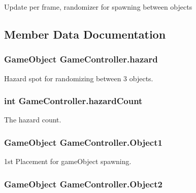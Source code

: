 Update per frame, randomizer for spawning between objects 



\subsection{Member Data Documentation}
\hypertarget{classGameController_a77c185a594a084fe342e8de517808654}{
\subsubsection[{hazard}]{\setlength{\rightskip}{0pt plus 5cm}Game\-Object Game\-Controller.\-hazard}}\label{classGameController_a77c185a594a084fe342e8de517808654}


Hazard spot for randomizing between 3 objects. 

\hypertarget{classGameController_a973f0e7d25e3b260cf0aa51730584ada}{
\subsubsection[{hazard\-Count}]{\setlength{\rightskip}{0pt plus 5cm}int Game\-Controller.\-hazard\-Count}}\label{classGameController_a973f0e7d25e3b260cf0aa51730584ada}


The hazard count. 

\hypertarget{classGameController_ae2d31db5ff00946e41b2dcd7ddda941a}{
\subsubsection[{Object1}]{\setlength{\rightskip}{0pt plus 5cm}Game\-Object Game\-Controller.\-Object1}}\label{classGameController_ae2d31db5ff00946e41b2dcd7ddda941a}


1st Placement for game\-Object spawning. 

\hypertarget{classGameController_ab5c9311e9997c3d8a34833b3760f28f8}{
\subsubsection[{Object2}]{\setlength{\rightskip}{0pt plus 5cm}Game\-Object Game\-Controller.\-Object2}}\label{classGameController_ab5c9311e9997c3d8a34833b3760f28f8}


